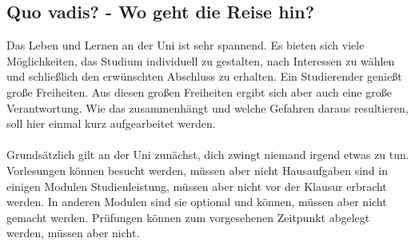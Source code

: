 \subsection{Quo vadis? - Wo geht die Reise hin?}
        Das Leben und Lernen an der Uni ist sehr spannend. Es bieten
	sich viele Möglichkeiten, das Studium individuell zu gestalten,
	nach Interessen zu wählen und schließlich den erwünschten
	Abschluss zu erhalten. Ein Studierender genießt große
	Freiheiten. Aus diesen großen Freiheiten ergibt sich aber auch
	eine große Verantwortung. Wie das zusammenhängt und welche
	Gefahren daraus resultieren, soll hier einmal kurz aufgearbeitet
	werden. \\ \\
        Grundsätzlich gilt an der Uni zunächst, dich zwingt niemand irgend etwas zu tun. Vorlesungen können besucht werden, müssen aber nicht
Hausaufgaben sind in einigen Modulen Studienleistung, müssen aber nicht vor der Klausur erbracht werden. In anderen Modulen sind sie optional und können, müssen aber nicht gemacht werden. 
Prüfungen können zum vorgesehenen Zeitpunkt abgelegt werden, müssen aber
nicht. \\\\
        
